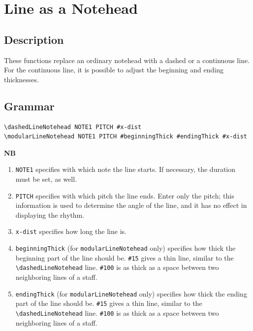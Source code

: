 \vfill \break





\section {Line as a Notehead}
\label{sec:line_notehead}
\hfill

\subsection{Description}
These functions replace an ordinary notehead with a dashed or a continuous line. For the continuous line, it is possible to adjust the beginning and ending thicknesses.
\subsection{Grammar}
\begin{verbatim}
\dashedLineNotehead NOTE1 PITCH #x-dist
\modularLineNotehead NOTE1 PITCH #beginningThick #endingThick #x-dist
\end{verbatim}

\textbf{NB} 
\begin{enumerate} 
\item \verb|NOTE1| specifies with which note the line starts. If necessary, the duration must be set, as well.
\item \verb|PITCH| specifies with which pitch the line ends. Enter only the pitch; this information is used to determine the angle of the line, and it has no effect in displaying the rhythm.  
\item \verb|x-dist| specifies how long the line is.  
\item \verb|beginningThick| (for \verb|modularLineNotehead| only) specifies how thick the beginning part of the line should be. \verb|#15| gives a thin line, similar to the \verb|\dashedLineNotehead| line. \verb|#100| is as thick as a space between two neighboring lines of a staff.
\item \verb|endingThick| (for \verb|modularLineNotehead| only) specifies how thick the ending part of the line should be. \verb|#15| gives a thin line, similar to the \verb|\dashedLineNotehead| line. \verb|#100| is as thick as a space between two neighboring lines of a staff.
\end{enumerate}

